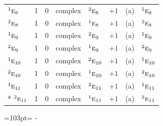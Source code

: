 \documentclass[10pt,a4paper]{article}
\newcommand{\needspace}[1]{\par\penalty-100\begingroup\dimen0=#1\relax\dimen2=\pagegoal
  \advance\dimen2-\pagetotal\ifdim\dimen0>\dimen2\relax\ifdim\dimen2>0pt\vfil\break\fi\fi
  \endgroup}
\numberwithin{equation}{section}
\newcommand{\irr}[1]{\text{\normalfont\scshape #1}}
\newcommand{\conjpair}[1]{{}^{#1}}
\begin{document}
{\begin{longtable}{@{}lrrllrll@{}}
$\conjpair{1}\irr{e}_{8}$ & 1 & $0$ & complex & $\conjpair{2}\irr{e}_{8}$ & $+1$ & (a) & $\conjpair{1}\irr{e}_{8}$\\
$\conjpair{2}\irr{e}_{8}$ & 1 & $0$ & complex & $\conjpair{1}\irr{e}_{8}$ & $+1$ & (a) & $\conjpair{2}\irr{e}_{8}$\\
$\conjpair{1}\irr{e}_{9}$ & 1 & $0$ & complex & $\conjpair{2}\irr{e}_{9}$ & $+1$ & (a) & $\conjpair{1}\irr{e}_{9}$\\
$\conjpair{2}\irr{e}_{9}$ & 1 & $0$ & complex & $\conjpair{1}\irr{e}_{9}$ & $+1$ & (a) & $\conjpair{2}\irr{e}_{9}$\\
$\conjpair{1}\irr{e}_{10}$ & 1 & $0$ & complex & $\conjpair{2}\irr{e}_{10}$ & $+1$ & (a) & $\conjpair{1}\irr{e}_{10}$\\
$\conjpair{2}\irr{e}_{10}$ & 1 & $0$ & complex & $\conjpair{1}\irr{e}_{10}$ & $+1$ & (a) & $\conjpair{2}\irr{e}_{10}$\\
$\conjpair{1}\irr{e}_{11}$ & 1 & $0$ & complex & $\conjpair{2}\irr{e}_{11}$ & $+1$ & (a) & $\conjpair{1}\irr{e}_{11}$\\*
$\conjpair{2}\irr{e}_{11}$ & 1 & $0$ & complex & $\conjpair{1}\irr{e}_{11}$ & $+1$ & (a) & $\conjpair{2}\irr{e}_{11}$\\
\bottomrule\end{longtable}}
\needspace{103pt}
\end{document}
